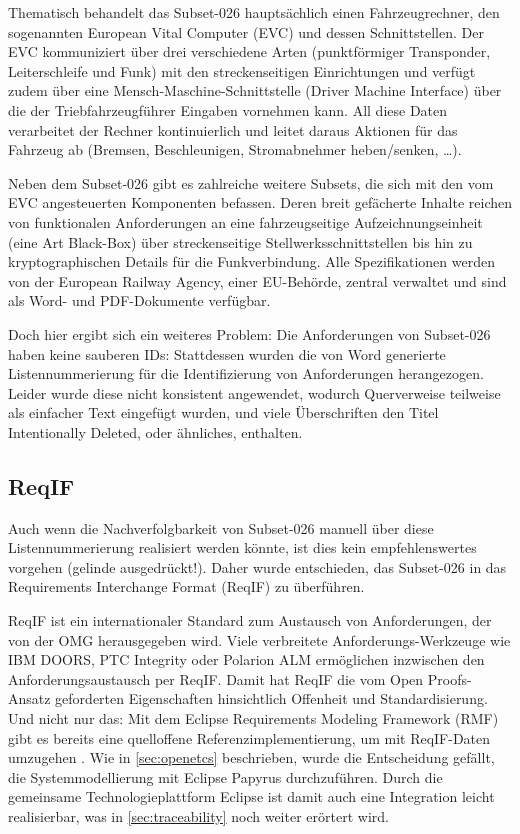 \documentclass[twoside]{article}
\begin{document}
\begin{multicols}{2}
Thematisch behandelt das Subset-026 hauptsächlich einen Fahrzeugrechner, den sogenannten European Vital Computer (EVC) und dessen Schnittstellen. Der EVC kommuniziert über drei verschiedene Arten (punktförmiger Transponder, Leiterschleife und Funk) mit den streckenseitigen Einrichtungen und verfügt zudem über eine Mensch-Maschine-Schnittstelle (Driver Machine Interface) über die der Triebfahrzeugführer Eingaben vornehmen kann. All diese Daten verarbeitet der Rechner kontinuierlich und leitet daraus Aktionen für das Fahrzeug ab (Bremsen, Beschleunigen, Stromabnehmer heben/senken, \ldots ).

Neben dem Subset-026 gibt es zahlreiche weitere Subsets, die sich mit den vom EVC angesteuerten Komponenten befassen. Deren breit gefächerte Inhalte reichen von funktionalen Anforderungen an eine fahrzeugseitige Aufzeichnungseinheit (eine Art \glqq{}Black-Box\grqq{}) über streckenseitige Stellwerksschnittstellen bis hin zu kryptographischen Details für die Funkverbindung. Alle Spezifikationen werden von der European Railway Agency, einer EU-Behörde, zentral verwaltet und sind als Word- und PDF-Dokumente verfügbar.

Doch hier ergibt sich ein weiteres Problem: Die Anforderungen von Subset-026 haben keine sauberen IDs: Stattdessen wurden die von Word generierte Listennummerierung für die Identifizierung von Anforderungen herangezogen. Leider wurde diese nicht konsistent angewendet, wodurch Querverweise teilweise als einfacher Text eingefügt wurden, und viele Überschriften den Titel \glqq{}Intentionally Deleted\grqq{}, oder ähnliches, enthalten.

\subsection{ReqIF}

Auch wenn die Nachverfolgbarkeit von Subset-026 manuell über diese Listennummerierung realisiert werden könnte, ist dies kein empfehlenswertes vorgehen (gelinde ausgedrückt!).  Daher wurde entschieden, das Subset-026 in das Requirements Interchange Format (ReqIF) zu überführen. 

ReqIF \cite{openup} ist ein internationaler Standard zum Austausch von Anforderungen, der von der OMG herausgegeben wird.  Viele verbreitete Anforderungs-Werkzeuge wie IBM DOORS, PTC Integrity oder Polarion ALM ermöglichen inzwischen den Anforderungsaustausch per ReqIF.  Damit hat ReqIF die vom Open Proofs-Ansatz geforderten Eigenschaften hinsichtlich Offenheit und Standardisierung.  Und nicht nur das: Mit dem Eclipse Requirements Modeling Framework (RMF) gibt es bereits eine quelloffene Referenzimplementierung, um mit ReqIF-Daten umzugehen \cite{reqcycle}. Wie in \ref{sec:openetcs} beschrieben, wurde die Entscheidung gefällt, die Systemmodellierung mit Eclipse Papyrus durchzuführen.  Durch die gemeinsame Technologieplattform Eclipse ist damit auch eine Integration leicht realisierbar, was in \ref{sec:traceability} noch weiter erörtert wird.


\end{multicols}
\end{document}
